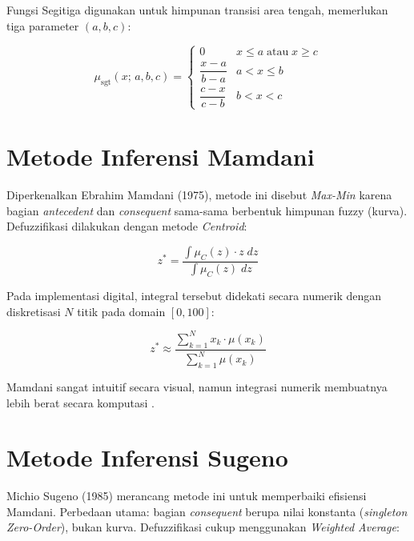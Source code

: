 \documentclass[12pt,a4paper]{report}
\begin{document}
Fungsi Segitiga digunakan untuk himpunan transisi area tengah,
memerlukan tiga parameter $(a, b, c)$:

\begin{equation}
  \mu_{\mathrm{sgt}}(x;\,a,b,c) =
  \begin{cases}
    0                        & x \le a \;\text{atau}\; x \ge c \\[4pt]
    \dfrac{x-a}{b-a}         & a < x \le b \\[6pt]
    \dfrac{c-x}{c-b}         & b < x < c
  \end{cases}
  \label{eq:segitiga}
\end{equation}

\section{Metode Inferensi Mamdani}

Diperkenalkan Ebrahim Mamdani (1975), metode ini disebut
\textit{Max-Min} karena bagian \textit{antecedent} dan
\textit{consequent} sama-sama berbentuk himpunan fuzzy (kurva).
Defuzzifikasi dilakukan dengan metode \textit{Centroid}:

\begin{equation}
  z^{*} = \frac{\displaystyle\int \mu_C(z)\cdot z\; dz}
               {\displaystyle\int \mu_C(z)\; dz}
  \label{eq:centroid}
\end{equation}

Pada implementasi digital, integral tersebut didekati secara
numerik dengan diskretisasi $N$ titik pada domain $[0, 100]$:

\begin{equation}
  z^{*} \approx
  \frac{\displaystyle\sum_{k=1}^{N} x_k \cdot \mu(x_k)}
       {\displaystyle\sum_{k=1}^{N} \mu(x_k)}
  \label{eq:centroid_diskret}
\end{equation}

Mamdani sangat intuitif secara visual, namun integrasi numerik
membuatnya lebih berat secara komputasi \cite{taylorfrancis_2024}.

\section{Metode Inferensi Sugeno}

Michio Sugeno (1985) merancang metode ini untuk memperbaiki
efisiensi Mamdani. Perbedaan utama: bagian \textit{consequent}
berupa nilai konstanta (\textit{singleton Zero-Order}), bukan
kurva. Defuzzifikasi cukup menggunakan \textit{Weighted Average}:
\end{document}
